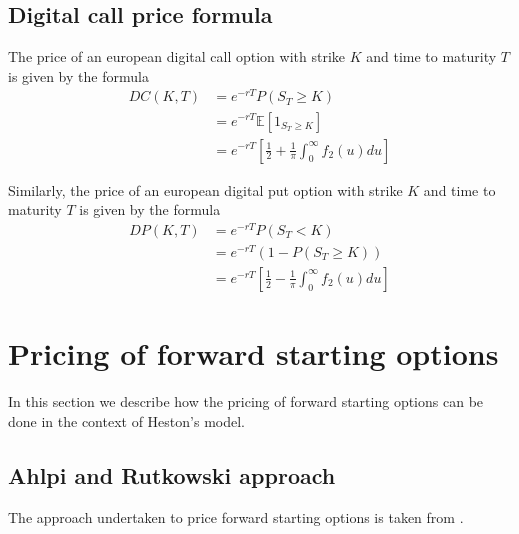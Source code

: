 \subsection{Digital call price formula}
\label{digital}
The price of an european digital call option with strike $K$ and time to maturity $T$ is given by the formula
\begin{equation}
\begin{aligned}
DC(K,T) &= e^{-r T} P(S_T \geq K) \\ &=  e^{-r T} \mathbb{E}\left[1_{S_T \geq K}\right] \\
&= e^{-r T}  \left[ \frac{1}{2} + \frac{1}{\pi}\int_0^{\infty}f_2(u) du \right] 
\end{aligned}
\end{equation}

Similarly, the price of an european digital put option with strike $K$ and time to maturity $T$ is given by the formula
\begin{equation}
\begin{aligned}
DP(K,T) &= e^{-r T} P(S_T < K) \\ 
&= e^{-r T} (1-P(S_T \geq K))  \\ 
& = e^{-r T}  \left[  \frac{1}{2} - \frac{1}{\pi}\int_0^{\infty}f_2(u) du \right] 
\end{aligned} 
\end{equation}


\section{Pricing of forward starting options}
In this section we describe how the pricing of forward starting options can be done in the context of Heston's model. 

\subsection{Ahlpi and Rutkowski approach}
The approach undertaken to price forward starting options is taken from \cite{ahlip2009forward}.


